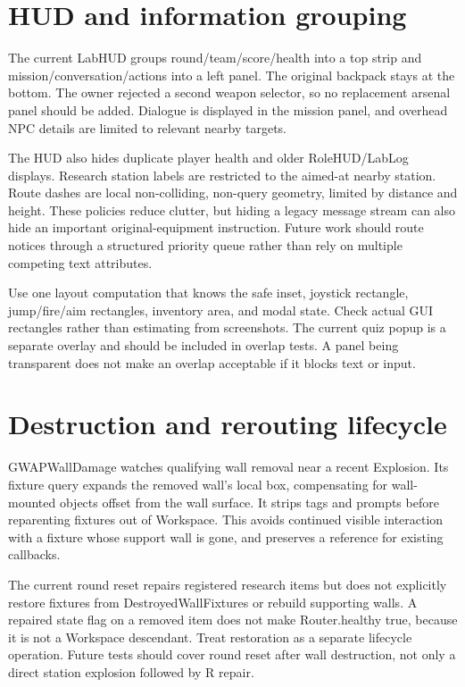 \section{HUD and information grouping}
The current LabHUD groups round/\allowbreak{}team/\allowbreak{}score/\allowbreak{}health into a top strip and mission/\allowbreak{}conversation/\allowbreak{}actions into a left panel.\allowbreak{} The original backpack stays at the bottom.\allowbreak{} The owner rejected a second weapon selector, so no replacement arsenal panel should be added.\allowbreak{} Dialogue is displayed in the mission panel, and overhead NPC details are limited to relevant nearby targets.\allowbreak{}

The HUD also hides duplicate player health and older RoleHUD/\allowbreak{}LabLog displays.\allowbreak{} Research station labels are restricted to the aimed-at nearby station.\allowbreak{} Route dashes are local non-colliding, non-query geometry, limited by distance and height.\allowbreak{} These policies reduce clutter, but hiding a legacy message stream can also hide an important original-equipment instruction.\allowbreak{} Future work should route notices through a structured priority queue rather than rely on multiple competing text attributes.\allowbreak{}

Use one layout computation that knows the safe inset, joystick rectangle, jump/\allowbreak{}fire/\allowbreak{}aim rectangles, inventory area, and modal state.\allowbreak{} Check actual GUI rectangles rather than estimating from screenshots.\allowbreak{} The current quiz popup is a separate overlay and should be included in overlap tests.\allowbreak{} A panel being transparent does not make an overlap acceptable if it blocks text or input.\allowbreak{}

\section{Destruction and rerouting lifecycle}
GWAPWallDamage watches qualifying wall removal near a recent Explosion.\allowbreak{} Its fixture query expands the removed wall's local box, compensating for wall-mounted objects offset from the wall surface.\allowbreak{} It strips tags and prompts before reparenting fixtures out of Workspace.\allowbreak{} This avoids continued visible interaction with a fixture whose support wall is gone, and preserves a reference for existing callbacks.\allowbreak{}

The current round reset repairs registered research items but does not explicitly restore fixtures from DestroyedWallFixtures or rebuild supporting walls.\allowbreak{} A repaired state flag on a removed item does not make Router.\allowbreak{}healthy true, because it is not a Workspace descendant.\allowbreak{} Treat restoration as a separate lifecycle operation.\allowbreak{} Future tests should cover round reset after wall destruction, not only a direct station explosion followed by R repair.\allowbreak{}


